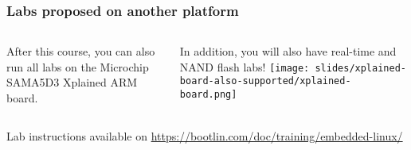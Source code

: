 \begin{frame}
\frametitle{Labs proposed on another platform}
  \begin{columns}
    After this course, you can also run all labs on the Microchip
    SAMA5D3 Xplained ARM board.

    In addition, you will also have real-time and NAND flash labs!
    \texttt{[image: slides/xplained-board-also-supported/xplained-board.png]}
  \end{columns}
  \vspace{1cm}
  Lab instructions available on
  \url{https://bootlin.com/doc/training/embedded-linux/}
\end{frame}

